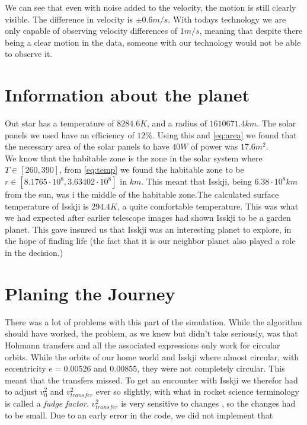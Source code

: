 \documentclass[a4paper, 10pt]{article}
\begin{document}
We can see that even with noise added to the velocity, the motion is still clearly visible. The difference in velocity is $\pm 0.6 m/s$. With todays technology we are only capable of observing velocity differences of $1 m/s$, meaning that despite there being a clear motion in the data, someone with our technology would not be able to observe it.




\section{Information about the planet}
Out star has a temperature of $8284.6 K$, and a radius of $1610671.4 km$. The solar panels we used have an efficiency of $12\%$. Using this and \ref{eq:area} we found that the necessary area of the solar panels to have $40W$ of power was   $17.6 m^2$. \\

We know that the habitable zone is the zone in the solar system where $T \in [260,390]$, from \ref{eq:temp} we found the habitable zone to be $r \in [8.1765\cdot 10^8,3.63402\cdot 10^8]$ in $km$. This meant that Isskji, being $6.38 \cdot 10^8 km$ from the sun, was i the middle of the habitable zone.The calculated surface temperature of Isskji is $294.4 K$, a quite comfortable temperature. This was what we had expected after earlier telescope images had shown Isskji to be a garden planet. This gave insured us that Isskji was an interesting planet to explore, in the hope of finding life (the fact that it is our neighbor planet also played a role in the decision.) 

\section{Planing the Journey}

There was a lot of problems with this part of the simulation. While the algorithm should have worked, the problem, as we knew but didn't take seriously, was that Hohmann transfers and all the associated expressions only work for circular orbits. While the orbits of our home world and Isskji where almost circular, with eccentricity $e = 0.00526$ and $0.00855$, they were not completely circular. This meant that the transfers missed. To get an encounter with Isskji we therefor had to adjust $v_0^2$ and $v_{transfer}^2$ ever so slightly, with what in rocket science terminology is called a \textit{fudge factor}. $v_{transfer}^2$ is very sensitive to changes \cite{SpaceDynamics}, so the changes had to be small. Due to an early error in the code, we did not implement that
\end{document}
